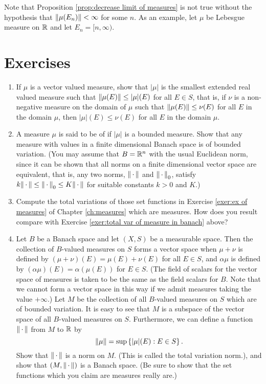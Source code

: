 Note that Proposition \ref{prop:decrease limit of measures} is not true without the hypothesis that $\norm{\mu(E_n)}<\infty$ for some $n$. As an example, let $\mu$ be Lebesgue measure on $\mathbb{R}$ and let $E_n=[n,\infty)$. 

\section{Exercises}
\begin{enumerate}[label=\arabic*),ref=\arabic*]
\item\label{exer:total var smallest}
If $\mu$ is a vector valued measure, show that $|\mu|$ is the smallest extended real valued measure such that $\norm{\mu(E)}\leq|\mu|(E)$ for all $E\in S$, that is, if $\nu$ is a non-negative measure on the domain of $\mu$ such that $\norm{\mu(E)}\leq\nu(E)$ for all $E$ in the domain $\mu$, then $|\mu|(E)\leq\nu(E)$ for all $E$ in the domain $\mu$.

\item\label{exer:total var of measure in banach}
A measure $\mu$ is said to be of  if $|\mu|$ is a bounded measure. Show that any measure with values in a finite dimensional Banach space is of bounded variation. (You may assume that $B=\mathbb{R}^n$ with the usual Euclidean norm, since it can be shown that all norms on a finite dimensional vector space are equivalent, that is, any two norms, $\norm{\,\cdot\,}$ and $\norm{\,\cdot\,}_0$, satisfy $k\norm{\,\cdot\,}\leq\norm{\,\cdot\,}_0\leq K\norm{\,\cdot\,}$ for suitable constants $k>0$ and $K$.)

\item Compute the total variations of those set functions in Exercise \ref{exer:ex of measures} of Chapter \ref{ch:measures} which are measures. How does you result compare with Exercise \ref{exer:total var of measure in banach} above?

\item Let $B$ be a Banach space and let $(X, S)$ be a measurable space. Then the collection of $B$-valued measures on $S$ forms a vector space when $\mu+\nu$ is defined by $(\mu+\nu)(E)=\mu(E)+\nu(E)$ for all $E\in S$, and $\alpha\mu$ is defined by $(\alpha\mu)(E)=\alpha(\mu(E))$ for $E\in S$. (The field of scalars for the vector space of measures is taken to be the same as the field scalars for $B$. Note that we cannot form a vector space in this way if we admit measures taking the value $+\infty$.) Let $M$ be the collection of all $B$-valued measures on $S$ which are of bounded variation. It is easy to see that $M$ is a subspace of the vector space of all $B$-valued measures on $S$. Furthermore, we can define a function $\norm{\,\cdot\,}$ from $M$ to $\mathbb{R}$ by \[\norm{\mu}=\sup\left\{|\mu|(E):E\in S\right\}.\] Show that $\norm{\,\cdot\,}$ is a norm on $M$. (This is called the total variation norm.), and show that $(M,\norm{\,\cdot\,})$ is a Banach space. (Be sure to show that the set functions which you claim are measures really are.)


\end{enumerate}
